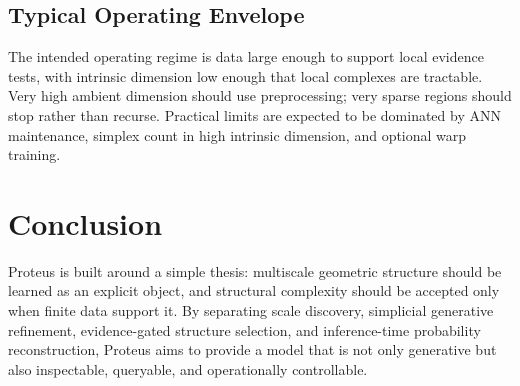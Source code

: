 \documentclass[11pt]{article}
\theoremstyle{definition}
\theoremstyle{plain}
\begin{document}
\subsection{Typical Operating Envelope}
The intended operating regime is data large enough to support local evidence tests, with intrinsic dimension low enough that local complexes are tractable. Very high ambient dimension should use preprocessing; very sparse regions should stop rather than recurse. Practical limits are expected to be dominated by ANN maintenance, simplex count in high intrinsic dimension, and optional warp training.

\section{Conclusion}
Proteus is built around a simple thesis: multiscale geometric structure should be learned as an explicit object, and structural complexity should be accepted only when finite data support it. By separating scale discovery, simplicial generative refinement, evidence-gated structure selection, and inference-time probability reconstruction, Proteus aims to provide a model that is not only generative but also inspectable, queryable, and operationally controllable.
\end{document}
